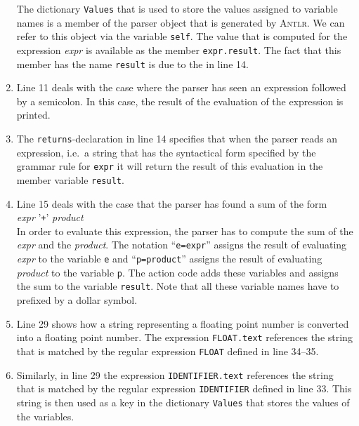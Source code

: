 \begin{enumerate}
      The dictionary \texttt{Values} that is used to store the values assigned to variable names 
      is a member of the parser object that is generated
      by \textsc{Antlr}.  We can refer to this object via the variable \texttt{self}.
      The value that is computed for the expression \textsl{expr} is available as
      the member \texttt{expr.result}.  
      The fact that this member has the name \texttt{result} is due to the 
      in line 14.
\item Line 11 deals with the case where the parser has seen an expression followed by a semicolon.
      In this case, the result of the evaluation of the expression is printed.
\item The \texttt{returns}-declaration in line 14 specifies that when the parser reads an expression,
      i.e.~a string that has the syntactical form specified by the grammar rule for \texttt{expr}
      it will return the result of this evaluation in the member variable \texttt{result}.
\item Line 15 deals with the case that the parser has found a sum of the form
      \\[0.2cm]
      \hspace*{1.3cm}
      \textsl{expr} '\texttt{+}' \textsl{product}
      \\[0.2cm]
      In order to evaluate this expression, the parser has to compute the sum of the \textsl{expr} and the
      \textsl{product}.  The notation ``\texttt{e=expr}'' assigns the result of evaluating \textsl{expr} to the
      variable \texttt{e} and 
      ``\texttt{p=product}'' assigns the result of evaluating \textsl{product} to the variable \texttt{p}.
      The action code adds these variables and assigns the sum to the variable \texttt{result}. 
      Note that all these variable names have to prefixed by a dollar symbol.
\item Line 29 shows how a string representing a floating point number is converted into a floating point
      number.  The expression \texttt{FLOAT.text} references the string that is matched
      by the regular expression \texttt{FLOAT} defined in line 34--35.
\item Similarly, in line 29 the expression \texttt{IDENTIFIER.text} references the string that is matched
      by the regular expression \texttt{IDENTIFIER} defined in line 33.  This string is then used as a key
      in the dictionary \texttt{Values} that stores the values of the variables.
\end{enumerate}

